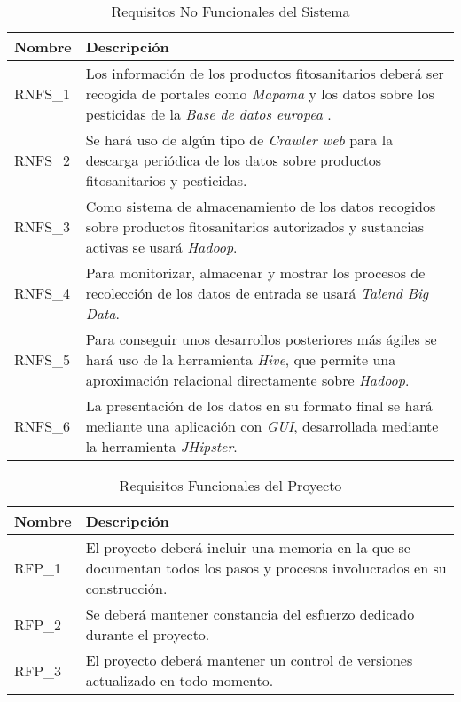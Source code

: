 \begin{table}[!h]
\centering
\bgroup
\def\arraystretch{1.3}
\begin{tabular}{l p{13cm}}
\toprule
\textbf{Nombre} & \textbf{Descripción} \\
 \midrule
RNFS\_1 & 
Los información de los productos fitosanitarios deberá ser recogida de portales como \textit{Mapama} \cite{mapama} y los datos sobre los pesticidas de la \textit{Base de datos europea} \cite{pesticides_eu}.
 \\
RNFS\_2 & 
Se hará uso de algún tipo de \textit{Crawler web} \cite{wikicrawler} para la descarga periódica de los datos sobre productos fitosanitarios y pesticidas.
 \\
RNFS\_3 & 
Como sistema de almacenamiento de los datos recogidos sobre productos fitosanitarios autorizados y sustancias activas se usará \textit{Hadoop}.
 \\
RNFS\_4 & 
Para monitorizar, almacenar y mostrar los procesos de recolección de los datos de entrada se usará \textit{Talend Big Data}. 
 \\
RNFS\_5 & 
Para conseguir unos desarrollos posteriores más ágiles se hará uso de la herramienta \textit{Hive}, que permite una aproximación relacional directamente sobre \textit{Hadoop}.
 \\
RNFS\_6 & 
La presentación de los datos en su formato final se hará mediante una aplicación con \textit{GUI}, desarrollada mediante la herramienta \textit{JHipster}.
 \\
\bottomrule
\end{tabular}
\egroup
\caption{Requisitos No Funcionales del Sistema}
\label{tab:req_no_func_sist}
\end{table}
\begin{table}[!h]
\centering
\bgroup
\def\arraystretch{1.3}
\begin{tabular}{l p{13cm}}
\toprule
\textbf{Nombre} & \textbf{Descripción} \\
 \midrule
RFP\_1 & 
El proyecto deberá incluir una memoria en la que se documentan todos los pasos y procesos involucrados en su construcción.
 \\
RFP\_2 & 
Se deberá mantener constancia del esfuerzo dedicado durante el proyecto.
 \\
RFP\_3 &
El proyecto deberá mantener un control de versiones actualizado en todo momento. 
 \\
\bottomrule
\end{tabular}
\egroup
\caption{Requisitos Funcionales del Proyecto}
\label{tab:req_func_proy}
\end{table}












 


















